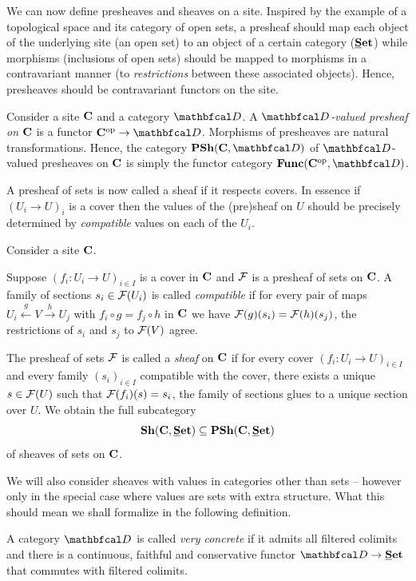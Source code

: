 We can now define presheaves and sheaves on a site. Inspired by the example of a topological space and its category of open sets, a presheaf should map each object of the underlying site (\ie an open set) to an object of a certain category (\eg ${{\mathbf{\underline{S}et}}}$) while morphisms (\ie inclusions of open sets) should be mapped to morphisms in a contravariant manner (\ie to \emph{restrictions} between these associated objects). Hence, presheaves should be contravariant functors on the site.
\begin{definition}[Presheaves]
	Consider a site ${{\mathbf{C}}}$ and a category $\category D$. A \emph{$\category D$-valued presheaf on ${{\mathbf{C}}}$} is a functor $\site C^\op \to \category D$. Morphisms of presheaves are natural transformations. Hence, the category $\Presheaves{\site C}{\category D}$ of $\category D$-valued presheaves on ${{\mathbf{C}}}$ is simply the functor category $\functorCategory{\site C^\op}{\category D}$.
\end{definition}

A presheaf of sets is now called a sheaf if it respects covers. In essence if $(U_i\to U)_i$ is a cover then the values of the (pre)sheaf on $U$ should be precisely determined by \emph{compatible} values on each of the $U_i$.
\begin{definition}
	\label{definition: compatible families and sheaves of sets}
	
	Consider a site ${{\mathbf{C}}}$.
	
	Suppose $(f_i\colon U_i\to U)_{i\in I}$ is a cover in ${{\mathbf{C}}}$ and ${\mathcal{F}}$ is a presheaf of sets on ${{\mathbf{C}}}$. A family of sections $s_i\in {\mathcal{F}}(U_i)$ is called \emph{compatible} if for every pair of maps $U_i \xleftarrow{g} V \xrightarrow{h} U_j$ with $f_i\circ g = f_j\circ h$ in ${{\mathbf{C}}}$ we have ${\mathcal{F}}(g)(s_i) = {\mathcal{F}}(h)(s_j)$, \ie the restrictions of $s_i$ and $s_j$ to ${\mathcal{F}}(V)$ agree.
	
	The presheaf of sets ${\mathcal{F}}$ is called a \emph{sheaf} on ${{\mathbf{C}}}$ if for every cover $(f_i\colon U_i\to U)_{i\in I}$ and every family $(s_i)_{i\in I}$ compatible with the cover, there exists a unique $s\in {\mathcal{F}}(U)$ such that ${\mathcal{F}}(f_i)(s)=s_i$, \ie the family of sections glues to a unique section over $U$. We obtain the full subcategory
	$$\Sheaves{\site C}{\Set} \subseteq \Presheaves{\site C}{\Set}$$
	of sheaves of sets on ${{\mathbf{C}}}$.
\end{definition}

We will also consider sheaves with values in categories other than sets -- however only in the special case where values are sets with extra structure. What this should mean we shall formalize in the following definition.
\begin{definition}
	\label{definition: very concrete categories}
	
	A category $\category{D}$ is called \emph{very concrete} if it admits all filtered colimits and there is a continuous, faithful and conservative functor $\category{D} \to \Set$ that commutes with filtered colimits.
\end{definition}

